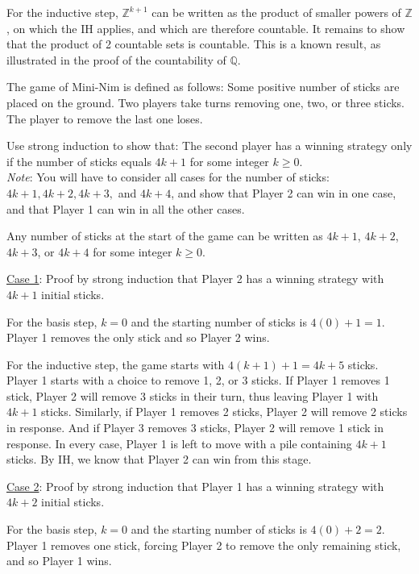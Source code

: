 \documentclass[a4paper]{exam}
\newcommand\Z{\ensuremath{\mathbb{Z}}}
\newcommand\Q{\ensuremath{\mathbb{Q}}}
\begin{document}
\begin{questions}
\begin{parts}
\begin{solution}
    For the inductive step, $\Z^{k+1}$ can be written as the product of smaller powers of $\Z$, on which the IH applies, and which are therefore countable. It remains to show that the product of 2 countable sets is countable. This is a known result, as illustrated in the proof of the countability of \Q.
  \end{solution}
\end{parts}

\question The game of Mini-Nim is defined as follows: Some positive number of sticks are placed on the ground. Two players take turns removing one, two, or three sticks. The player to remove the last one loses.

  Use strong induction to show that: The second player has a winning strategy only if the number of sticks equals \( 4k + 1 \) for some integer \( k \ge 0 \).\\
  \textit{Note}: You will have to consider all cases for the number of sticks: \( 4k+1, 4k+2, 4k+3, \) and \( 4k+4 \), and show that Player 2 can win in one case, and that Player 1 can win in all the other cases.

  \begin{solution}
    Any number of sticks at the start of the game can be written as $4k+1$, $4k+2$, $4k+3$, or $4k+4$ for some integer $k\ge0$.

    \underline{Case 1}: Proof by strong induction that Player 2 has a winning strategy with $4k+1$ initial sticks.

    For the basis step, $k=0$ and the starting number of sticks is $4(0) + 1 = 1$. Player 1 removes the only stick and so Player 2 wins.

    For the inductive step, the game starts with $4(k+1) + 1=4k+5$ sticks. Player 1 starts with a choice to remove 1, 2, or 3 sticks. If Player 1 removes 1 stick, Player 2 will remove 3 sticks in their turn, thus leaving Player 1 with $4k+1$ sticks. Similarly, if Player 1 removes 2 sticks, Player 2 will remove 2 sticks in response. And if Player 3 removes 3 sticks, Player 2 will remove 1 stick in response. In every case, Player 1 is left to move with a pile containing $4k+1$ sticks. By IH, we know that Player 2 can win from this stage.
    
    \underline{Case 2}: Proof by strong induction that Player 1 has a winning strategy with $4k+2$ initial sticks.

    For the basis step, $k=0$ and the starting number of sticks is $4(0) + 2 = 2$. Player 1 removes one stick, forcing Player 2 to remove the only remaining stick, and so Player 1 wins.


\end{solution}
\end{questions}
\end{document}
